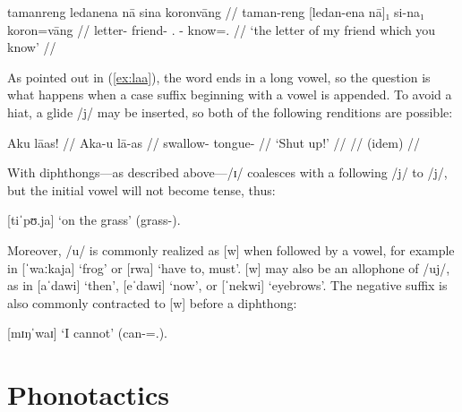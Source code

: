 \ex\begingl
	\gla tamanreng ledanena nā sina koronvāng //
	\glb taman-reng [ledan-ena nā]₁ si-na₁ koron=vāng //
	\glc letter-\AargI{} friend-\Gen{} \Fsg.\Gen{} \Rel{}-\Gen{} 
		know=\Ssg{}.\Aarg{} //
	\glft `the letter of my friend which you know' //
\endgl\xe

As pointed out in (\ref{ex:laa}), the word  ends in a 
long vowel, so the question is what happens when a case suffix beginning with a 
vowel is appended. To avoid a hiat, a glide /j/ may be inserted, so both of 
the following renditions are possible:

\pex
	\a\begingl
		\gla Aku lāas! //
		\glb Aka-u lā-as //
		\glc swallow-\Imp{} tongue-\Parg{} //
		\glft `Shut up!' //
	\endgl
	\a\begingl
		 //
		\glft (idem) //
	\endgl
\xe

With diphthongs---as described above---/ɪ/ coalesces with a 
following /j/ to /j/, but the initial vowel will not become tense, thus:

\ex
	 [tiˈpʊ.ja] `on the grass' 
		(grass-\Loc{}).
\xe

Moreover, /u/ is commonly realized as [w] when followed by a vowel, for example 
in  [ˈwaːkaja] `frog' or  [rwa] `have 
to, must'. [w] may also be an allophone of /uj/, as in  
[aˈdawi] `then',  [eˈdawi] `now', or  
[ˈnekwi] `eyebrows'. The negative suffix  is also commonly 
contracted to [w] before a diphthong:

\ex
	 [mɪŋˈwaɪ] 
		`I cannot' (can-\Neg{}=\Fsg{}.\Top{}).
\xe

%
%

\section{Phonotactics}
\label{sec:phonotactics}

